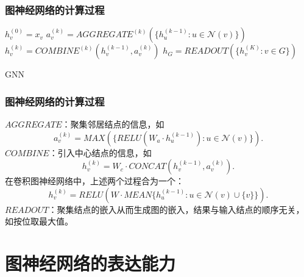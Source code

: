 \documentclass{beamer}
\begin{document}
\begin{frame}

  \frametitle{图神经网络的计算过程}
    \begin{algorithm}[H]
    \begin{algorithmic}[1]
        \STATE $h_v^{(0)} = x_v$
      \ENDFOR
        \STATE $a_v^{(k)} = AGGREGATE^{(k)}(\{h_u^{(k-1)} : u \in \mathcal{N}(v)\})$
        \STATE $h_v^{(k)} = COMBINE^{(k)}(h_v^{(k-1)}, a_v^{(k)})$
      \ENDFOR
      \STATE $h_G = READOUT(\{h_v^{(K)} : v \in G\})$
    \end{algorithmic}
    \caption{GNN}
    \label{alg:gnn}
    \end{algorithm}
      
\end{frame}

\begin{frame}

  \frametitle{图神经网络的计算过程}
      
  $AGGREGATE$：聚集邻居结点的信息，如 
  $$a_v^{(k)} = MAX(\{RELU(W_a \cdot h_u^{(k-1)}) : u \in \mathcal{N}(v)\}).$$
  $COMBINE$：引入中心结点的信息，如
  $$h_v^{(k)} = W_c \cdot CONCAT(h_v^{(k-1)}, a_v^{(k)}).$$
  在卷积图神经网络中，上述两个过程合为一个：
  $$h_v^{(k)} = RELU(W \cdot MEAN \{h_u^{(k-1)} : u \in \mathcal{N}(v) \cup \{v\} \}).$$
  $READOUT$：聚集结点的嵌入从而生成图的嵌入，结果与输入结点的顺序无关，如按位取最大值。
\end{frame}

\section{图神经网络的表达能力}
\end{document}

